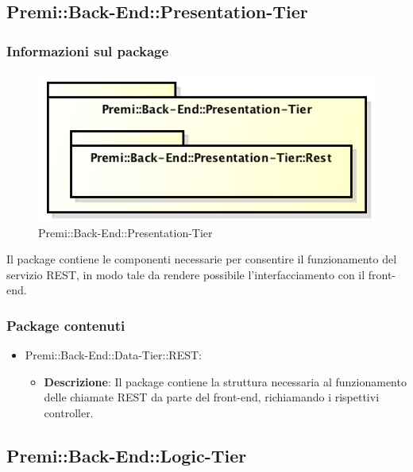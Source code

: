 \newpage

\subsection{Premi::Back-End::Presentation-Tier}
	\subsubsection*{Informazioni sul package}
		\begin{figure}[h]
			\centering
			\includegraphics[width=0.5\linewidth]{img/back-end_presentation-tier}
			\caption[Premi::Back-End::Presentation-Tier]{Premi::Back-End::Presentation-Tier}
		\end{figure}
		Il package contiene le componenti necessarie per consentire il funzionamento del servizio \gls{REST}, in modo tale da rendere possibile l'interfacciamento con il \gls{front-end}.
		
	\subsubsection*{Package contenuti}
		\begin{itemize}
			\item Premi::Back-End::Data-Tier::REST:
			\begin{itemize}
				\item \textbf{Descrizione}: Il package contiene la struttura necessaria al funzionamento delle chiamate \gls{REST} da parte del \gls{front-end}, richiamando i rispettivi controller.
			\end{itemize}
		\end{itemize}
		
\newpage
		
\subsection{Premi::Back-End::Logic-Tier}
